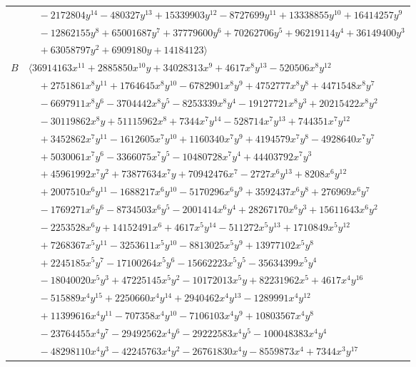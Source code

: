 \documentclass[11pt]{article}
\begin{document}
\begin{longtable}{@{}ll@{}}
 & $\quad -2172804y^{14}-480327y^{13}+15339903y^{12}-8727699y^{11}+13338855y^{10}+16414257y^{9}$\\
 & $\quad -12862155y^{8}+65001687y^{7}+37779600y^{6}+70262706y^{5}+96219114y^{4}+36149400y^{3}$\\
 & $\quad +63058797y^{2}+6909180y+14184123\rangle$\\
$B$ & $\langle 36914163x^{11}+2885850x^{10}y+34028313x^{9}+4617x^{8}y^{13}-520506x^{8}y^{12}$\\
 & $\quad +2751861x^{8}y^{11}+1764645x^{8}y^{10}-6782901x^{8}y^{9}+4752777x^{8}y^{8}+4471548x^{8}y^{7}$\\
 & $\quad -6697911x^{8}y^{6}-3704442x^{8}y^{5}-8253339x^{8}y^{4}-19127721x^{8}y^{3}+20215422x^{8}y^{2}$\\
 & $\quad -30119862x^{8}y+51115962x^{8}+7344x^{7}y^{14}-528714x^{7}y^{13}+744351x^{7}y^{12}$\\
 & $\quad +3452862x^{7}y^{11}-1612605x^{7}y^{10}+1160340x^{7}y^{9}+4194579x^{7}y^{8}-4928640x^{7}y^{7}$\\
 & $\quad +5030061x^{7}y^{6}-3366075x^{7}y^{5}-10480728x^{7}y^{4}+44403792x^{7}y^{3}$\\
 & $\quad +45961992x^{7}y^{2}+73877634x^{7}y+70942476x^{7}-2727x^{6}y^{13}+8208x^{6}y^{12}$\\
 & $\quad +2007510x^{6}y^{11}-1688217x^{6}y^{10}-5170296x^{6}y^{9}+3592437x^{6}y^{8}+276969x^{6}y^{7}$\\
 & $\quad -1769271x^{6}y^{6}-8734503x^{6}y^{5}-2001414x^{6}y^{4}+28267170x^{6}y^{3}+15611643x^{6}y^{2}$\\
 & $\quad -2253528x^{6}y+14152491x^{6}+4617x^{5}y^{14}-511272x^{5}y^{13}+1710849x^{5}y^{12}$\\
 & $\quad +7268367x^{5}y^{11}-3253611x^{5}y^{10}-8813025x^{5}y^{9}+13977102x^{5}y^{8}$\\
 & $\quad +2245185x^{5}y^{7}-17100264x^{5}y^{6}-15662223x^{5}y^{5}-35634399x^{5}y^{4}$\\
 & $\quad -18040020x^{5}y^{3}+47225145x^{5}y^{2}-10172013x^{5}y+82231962x^{5}+4617x^{4}y^{16}$\\
 & $\quad -515889x^{4}y^{15}+2250660x^{4}y^{14}+2940462x^{4}y^{13}-1289991x^{4}y^{12}$\\
 & $\quad +11399616x^{4}y^{11}-707358x^{4}y^{10}-7106103x^{4}y^{9}+10803567x^{4}y^{8}$\\
 & $\quad -23764455x^{4}y^{7}-29492562x^{4}y^{6}-29222583x^{4}y^{5}-100048383x^{4}y^{4}$\\
 & $\quad -48298110x^{4}y^{3}-42245763x^{4}y^{2}-26761830x^{4}y-8559873x^{4}+7344x^{3}y^{17}$\\

\end{longtable}
\end{document}
